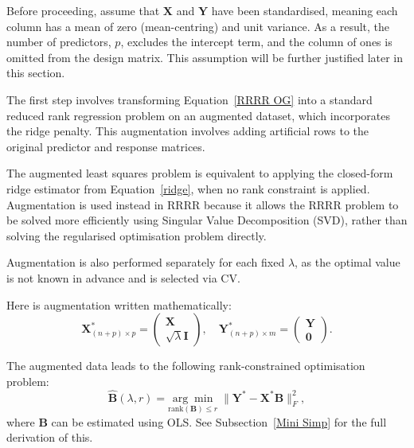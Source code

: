 \documentclass[11pt]{report} %
\begin{document}
Before proceeding, assume that $\mathbf{X}$ and $\mathbf{Y}$ have been standardised, meaning each column has a mean of zero (mean-centring) and unit variance.
 As a result, the number of predictors, $p$, excludes the intercept term, and the column of ones is omitted from the design matrix. This assumption will be further justified later in this section.

The first step involves transforming Equation~\ref{RRRR OG} into a standard reduced rank regression problem
on an augmented dataset, which incorporates the ridge penalty.\cite{mukherjee2011reduced} This augmentation involves adding artificial rows to the original predictor and response matrices. 

The augmented least squares problem is equivalent to applying the closed-form ridge estimator from Equation~\ref{ridge}, when no rank constraint is applied. 
Augmentation is used instead in RRRR because it allows the RRRR problem to be solved more efficiently using Singular Value Decomposition (SVD), rather than solving the regularised optimisation problem directly.

Augmentation is also performed separately for each fixed \(\lambda\), as the optimal value is not known in advance and is selected via CV.

Here is augmentation written mathematically:
\begin{equation*}
    \mathbf{X}^*_{(n+p) \times p} = 
    \begin{pmatrix} 
        \mathbf{X} \\ 
        \sqrt{\lambda} \mathbf{I} 
    \end{pmatrix}, 
    \quad
    \mathbf{Y}^*_{(n+p) \times m} = 
    \begin{pmatrix} 
        \mathbf{Y} \\ 
        \mathbf{0} 
    \end{pmatrix}.
\end{equation*}

\noindent The augmented data leads to the following rank-constrained optimisation problem: 
\[\hat{\mathbf{B}}(\lambda, r) = 
\underset{\text{rank}(\mathbf{B}) \leq r}{\arg\min} 
\; \| \mathbf{Y}^* - \mathbf{X}^* \mathbf{B} \|_F^2,\]
where $\mathbf{{B}}$ can be estimated using OLS. See Subsection~\ref{Mini Simp} for the full derivation of this.
\end{document}
